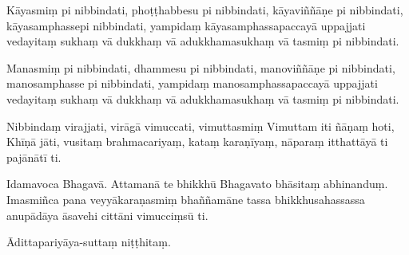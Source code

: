 Kāyasmiṃ pi nibbindati, phoṭṭhabbesu pi nibbindati, kāyaviññāṇe pi
nibbindati, kāyasamphassepi nibbindati, yampidaṃ kāyasamphassapaccayā
uppajjati vedayitaṃ sukhaṃ vā dukkhaṃ vā adukkhamasukhaṃ vā tasmiṃ pi
nibbindati.

Manasmiṃ pi nibbindati, dhammesu pi nibbindati, manoviññāṇe pi
nibbindati, manosamphasse pi nibbindati, yampidaṃ manosamphassapaccayā
uppajjati vedayitaṃ sukhaṃ vā dukkhaṃ vā adukkhamasukhaṃ vā tasmiṃ pi
nibbindati.

Nibbindaṃ virajjati, virāgā vimuccati, vimuttasmiṃ Vimuttam iti ñāṇaṃ
hoti, Khīṇā jāti, vusitaṃ brahmacariyaṃ, kataṃ karaṇīyaṃ, nāparaṃ
itthattāyā ti pajānātī ti.

\enlargethispage{\baselineskip}

Idamavoca Bhagavā. Attamanā te bhikkhū Bhagavato bhāsitaṃ abhinanduṃ.
Imasmiñca pana veyyākaraṇasmiṃ bhaññamāne tassa bhikkhusahassassa
anupādāya āsavehi cittāni vimucciṃsū ti.

Ādittapariyāya-suttaṃ niṭṭhitaṃ.

\resumeNormalText

